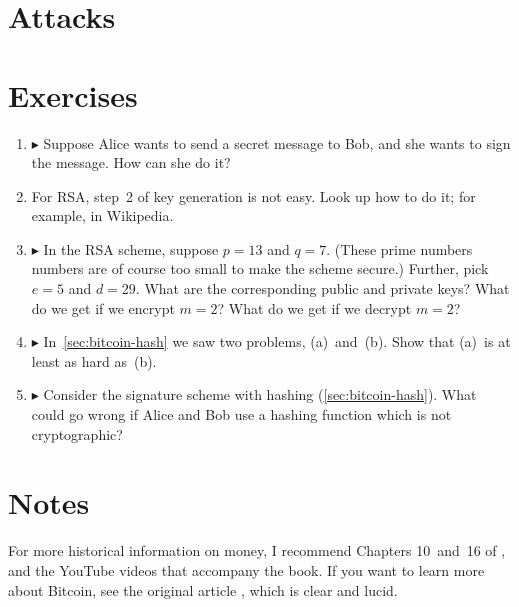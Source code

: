 \section{Attacks}\label{sec:bitcoin-attacks}

\section{Exercises}

\begin{enumerate}
\item
  $\blacktriangleright$
  Suppose Alice wants to send a secret message to Bob, and she wants to sign the message.
  How can she do it?

\item
  For RSA, step~2 of key generation is not easy.
  Look up how to do it; for example, in Wikipedia.

\item
  $\blacktriangleright$
  In the RSA scheme, suppose $p=13$ and $q=7$.
  (These prime numbers numbers are of course too small to make the scheme secure.)
  Further, pick $e=5$ and $d=29$.
  What are the corresponding public and private keys?
  What do we get if we encrypt $m=2$?
  What do we get if we decrypt $m=2$?

\item
  $\blacktriangleright$
  In~\autoref{sec:bitcoin-hash} we saw two problems, (a)~and~(b).
  Show that (a)~is at least as hard as~(b).

\item
  $\blacktriangleright$
  Consider the signature scheme with hashing (\autoref{sec:bitcoin-hash}).
  What could go wrong if Alice and Bob use a hashing function which is not cryptographic?
\end{enumerate}

\section{Notes}

For more historical information on money, I recommend Chapters 10~and~16 of \citet{sapiens}, and the YouTube videos that accompany the book.
If you want to learn more about Bitcoin, see the original article \citep{bitcoin}, which is clear and lucid.




